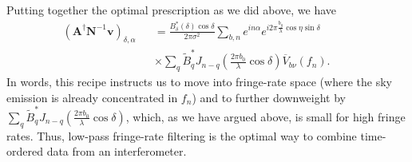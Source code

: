 \documentclass[twocolumn,apj,numberedappendix]{emulateapj}
\newcommand{\vis}{\mathbf{v}}
\newcommand{\A}{\mathbf{A}}
\newcommand{\N}{\mathbf{N}}
\begin{document}
Putting together the optimal prescription as we did above, we have
%
\begin{eqnarray}
\label{eq:AdagNinvv}
\left( \A^\dagger \N^{-1} \vis \right)_{\delta,\alpha} && = \frac{B_\delta^* (\delta)  \cos \delta}{2\pi \sigma^2} \sum_{b,n} e^{i n \alpha} e^{i 2 \pi  \frac{b_y}{\lambda} \cos \eta \sin \delta} \nonumber \\
&& \times \sum_{q} \widetilde{B}_q^* J_{n-q} \left( \frac{2 \pi b_0}{\lambda} \cos \delta \right) \overline{V}_{b\nu} (f_n). \qquad
\end{eqnarray}
In words, this recipe instructs us to move into fringe-rate space (where the
sky emission is already concentrated in $f_n$) and to further downweight by
$\sum_{q} \widetilde{B}_q^* J_{n-q} \left( \frac{2 \pi b_0}{\lambda} \cos \delta \right)$, which, as we have argued above, is small for high fringe
rates.  Thus, low-pass fringe-rate filtering is the optimal way to combine
time-ordered data from an interferometer.
\end{document}
